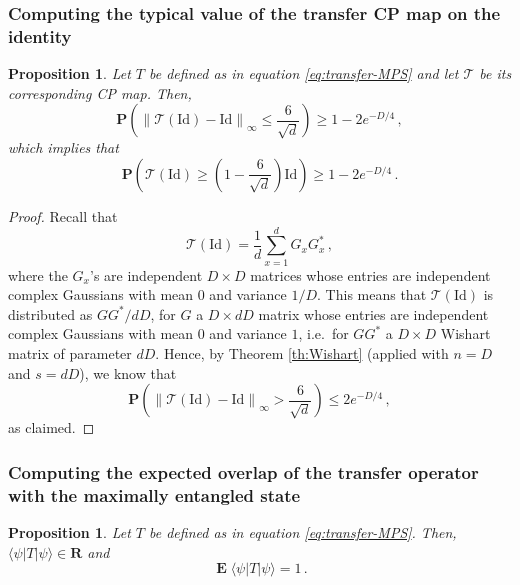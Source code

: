 \documentclass{amsart}
\newtheorem{proposition}[theorem]{Proposition}
\newcommand{\R}{\mathbf{R}}
\renewcommand{\P}{\mathbf{P}}
\renewcommand{\leq}{\leqslant}
\renewcommand{\geq}{\geqslant}
\newcommand{\Id}{\mathrm{Id}}
\DeclareMathOperator{\E}{\mathbf{E}}
\newcommand{\bra}[1]{\langle #1 |}
\newcommand{\ket}[1]{| #1 \rangle}
\begin{document}
\subsubsection{Computing the typical value of the transfer CP map on the identity} \hfill\par\smallskip

\begin{proposition} \label{prop:MPS-CP}
    Let $T$ be defined as in equation \eqref{eq:transfer-MPS} and let $\mathcal T$ be its corresponding CP map. Then,
    \[ \P \left( \left\| \mathcal T(\Id) - \Id \right\|_{\infty} \leq \frac{6}{\sqrt{d}} \right) \geq 1-2e^{-D/4} \, , \]
    which implies that
    \[ \P \left( \mathcal T(\Id) \geq \left(1-\frac{6}{\sqrt{d}}\right)\Id \right) \geq 1-2e^{-D/4} \, . \]
\end{proposition}

\begin{proof}
    Recall that
    \[ \mathcal T(\Id) = \frac{1}{d} \sum_{x=1}^d G_xG_x^* \, , \]
    where the $G_x$'s are independent $D\times D$ matrices whose entries are independent complex Gaussians with mean $0$ and variance $1/D$. This means that $\mathcal T(\Id)$ is distributed as $GG^*/dD$, for $G$ a $D\times dD$ matrix whose entries are independent complex Gaussians with mean $0$ and variance $1$, i.e.~for $GG^*$ a $D\times D$ Wishart matrix of parameter $dD$. Hence, by Theorem \ref{th:Wishart} (applied with $n=D$ and $s=dD$), we know that
    \[ \P \left( \left\| \mathcal T(\Id) - \Id \right\|_{\infty} > \frac{6}{\sqrt{d}} \right) \leq 2e^{-D/4} \, , \]
    as claimed.
\end{proof}

\subsubsection{Computing the expected overlap of the transfer operator with the maximally entangled state} \hfill\par\smallskip

\begin{proposition} \label{prop:MPS-1}
    Let $T$ be defined as in equation \eqref{eq:transfer-MPS}. Then, $\bra{\psi}T\ket{\psi}\in\R$ and
    \[ \E\bra{\psi}T\ket{\psi} = 1 \, . \]
\end{proposition}
\end{document}
